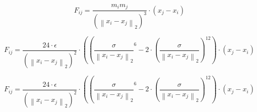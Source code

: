 \documentclass{article}
\begin{document}
\[ F_{ij} = \frac{m_i m_j}{\left( \left\lVert x_i - x_j \right\rVert_2 \right)^3} \cdot \left( x_j - x_i \right) \]
\pagebreak

\[ F_{ij} = \frac{24 \cdot \epsilon}{\left( \left\lVert x_i - x_j \right\rVert _2 \right) ^2} \cdot \left( \left( \frac{\sigma}{\left\lVert x_i - x_j \right\rVert _2}^6 - 2 \cdot \left( \frac{\sigma}{\left\lVert x_i - x_j \right\rVert _2} \right) ^{12} \right) \cdot \left( x_j - x_i \right) \]
\pagebreak

\[ F_{ij} = \frac{24 \cdot \epsilon}{\left( \left\lVert x_i - x_j \right\rVert_2 \right)^2} \cdot \left( \left( \frac{\sigma}{\left\lVert x_i - x_j \right\rVert_2}^6 - 2 \cdot \left( \frac{\sigma}{\left\lVert x_i - x_j \right\rVert_2} \right)^{12} \right) \cdot \left( x_j - x_i \right) \]
\pagebreak
\end{document}

